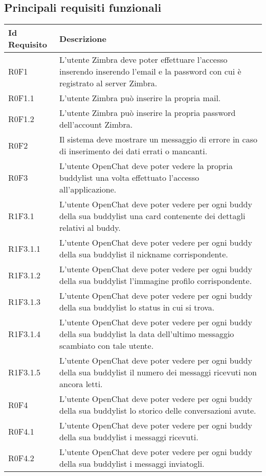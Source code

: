 \subsection{Principali requisiti funzionali}
\begin{longtable}{|C{3cm}| C{10cm}|}
	\hline
	\textbf{Id Requisito} & \textbf{Descrizione}\\
	\hline
	\endhead
	R0F1 & L'utente Zimbra deve poter effettuare l'accesso inserendo inserendo l'email e la password con cui è registrato al server Zimbra.  \\ \hline 
	R0F1.1 & L'utente Zimbra può inserire la propria mail. \\ \hline 
	R0F1.2 & L'utente Zimbra  può inserire la propria password dell'account Zimbra.\\ \hline 
	R0F2 & Il sistema deve mostrare un messaggio di errore in caso di inserimento dei dati errati o mancanti.  \\ \hline 
	R0F3 & L'utente OpenChat deve poter vedere la propria buddylist una volta effettuato l'accesso all'applicazione. \\ \hline 
	R1F3.1 & L'utente OpenChat deve poter vedere per ogni buddy della sua buddylist una card contenente dei dettagli relativi al buddy. \\ \hline 
	R1F3.1.1 & L'utente OpenChat deve poter vedere per ogni buddy della sua buddylist il nickname corrispondente. \\ \hline 
	R1F3.1.2 & L'utente OpenChat deve poter vedere per ogni buddy della sua buddylist l'immagine profilo corrispondente. \\ \hline 
	R1F3.1.3 & L'utente OpenChat deve poter vedere per ogni buddy della sua buddylist lo status in cui si trova. \\ \hline 
	R1F3.1.4 & L'utente OpenChat deve poter vedere per ogni buddy della sua buddylist la data dell'ultimo messaggio scambiato con tale utente. \\ \hline 
	R1F3.1.5 & L'utente OpenChat deve poter vedere per ogni buddy della sua buddylist il numero dei messaggi ricevuti non ancora letti. \\ \hline 
	R0F4 & L'utente OpenChat deve poter vedere per ogni buddy della sua buddylist lo storico delle conversazioni avute. \\ \hline 
	R0F4.1 & L'utente OpenChat deve poter vedere per ogni buddy della sua buddylist i messaggi ricevuti. \\ \hline 
	R0F4.2 & L'utente OpenChat deve poter vedere per ogni buddy della sua buddylist i messaggi inviatogli. \\ \hline 

\end{longtable}
